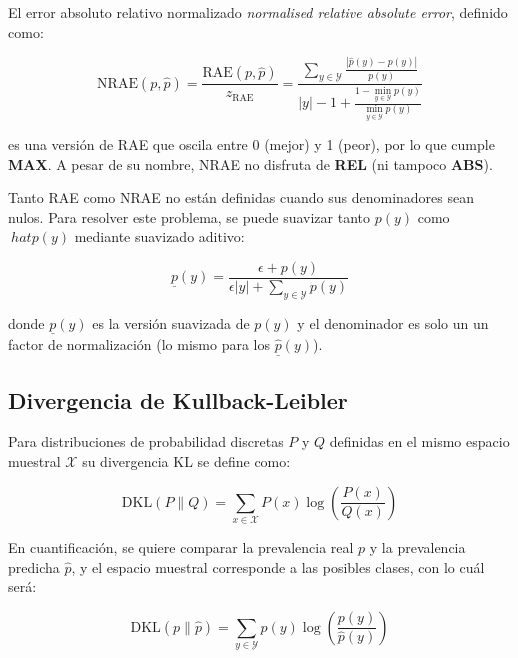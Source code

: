 El error absoluto relativo normalizado {\it normalised relative absolute error},
definido como:

\begin{equation}
    {\text{NRAE}(p, \hat p)} = \frac{\text{RAE}(p, \hat p)}{z_{\text{RAE}}} = \frac{\sum \limits_{y\in {\mathcal {Y}}}{\frac{|\hat p(y) - p(y)|}{p(y)}}}{|y| - 1 + \frac {1 - \displaystyle \min_{y\in {\mathcal {Y}}}p(y)}{\displaystyle \min_{y\in {\mathcal {Y}}}p(y)}}
\end{equation}

es una versión de RAE que oscila entre 0 (mejor) y 1 (peor), por lo que cumple
{\bf MAX}. A pesar de su nombre, NRAE no disfruta de {\bf REL} (ni tampoco {\bf
ABS}).

Tanto RAE como NRAE no están definidas cuando sus denominadores sean nulos. Para
resolver este problema, se puede suavizar tanto $p(y)$ como $\ hat p(y)$
mediante suavizado aditivo:

\begin{equation}
    \underline p(y) = \frac{\epsilon + p(y)}{\epsilon  |y| + \sum \limits_{y\in {\mathcal {Y}}}{p(y)}}
\end{equation}

donde $\underline p(y)$ es la versión suavizada de $p(y)$ y el denominador es
solo un un factor de normalización (lo mismo para los $\underline {\hat p}(y)$).

\subsection{Divergencia de Kullback-Leibler}

Para distribuciones de probabilidad discretas $P$ y $Q$ definidas en el mismo
espacio muestral ${\mathcal {X}}$ su divergencia KL se define como:

\begin{equation}
    {\text{DKL}}(P\parallel Q)=\sum _{x\in {\mathcal {X}}}P(x)\log \left({\frac {P(x)}{Q(x)}}\right)
\end{equation}

En cuantificación, se quiere comparar la prevalencia real $p$ y la prevalencia
predicha $\hat{p}$, y el espacio muestral corresponde a las posibles clases, con
lo cuál será:

\begin{equation}
    {\text{DKL}}(p\parallel \hat{p}) = \sum _{y\in {\mathcal {Y}}}p(y)\log \left({\frac {p(y)}{\hat p(y)}}\right)
\end{equation}

